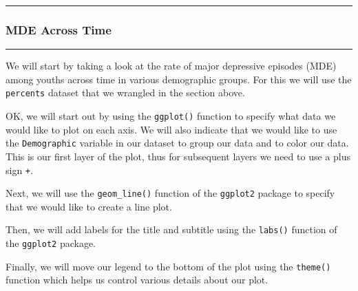 \documentclass[
]{article}
\newenvironment{Shaded}{\begin{snugshade}}{\end{snugshade}}
\newcommand{\DataTypeTok}[1]{\textcolor[rgb]{0.13,0.29,0.53}{#1}}
\newcommand{\DecValTok}[1]{\textcolor[rgb]{0.00,0.00,0.81}{#1}}
\newcommand{\KeywordTok}[1]{\textcolor[rgb]{0.13,0.29,0.53}{\textbf{#1}}}
\newcommand{\NormalTok}[1]{#1}
\newcommand{\OperatorTok}[1]{\textcolor[rgb]{0.81,0.36,0.00}{\textbf{#1}}}
\newcommand{\StringTok}[1]{\textcolor[rgb]{0.31,0.60,0.02}{#1}}
\begin{document}
\begin{center}\rule{0.5\linewidth}{0.5pt}\end{center}

\hypertarget{mde-across-time}{%
\subsubsection{\texorpdfstring{\textbf{MDE Across
Time}}{MDE Across Time}}\label{mde-across-time}}

\begin{center}\rule{0.5\linewidth}{0.5pt}\end{center}

We will start by taking a look at the rate of major depressive episodes
(MDE) among youths across time in various demographic groups. For this
we will use the \texttt{percents} dataset that we wrangled in the
section above.

OK, we will start out by using the \texttt{ggplot()} function to specify
what data we would like to plot on each axis. We will also indicate that
we would like to use the \texttt{Demographic} variable in our dataset to
group our data and to color our data. This is our first layer of the
plot, thus for subsequent layers we need to use a plus sign \texttt{+}.

Next, we will use the \texttt{geom\_line()} function of the
\texttt{ggplot2} package to specify that we would like to create a line
plot.

Then, we will add labels for the title and subtitle using the
\texttt{labs()} function of the \texttt{ggplot2} package.

Finally, we will move our legend to the bottom of the plot using the
\texttt{theme()} function which helps us control various details about
our plot.

\begin{Shaded}
\end{Shaded}
\end{document}
